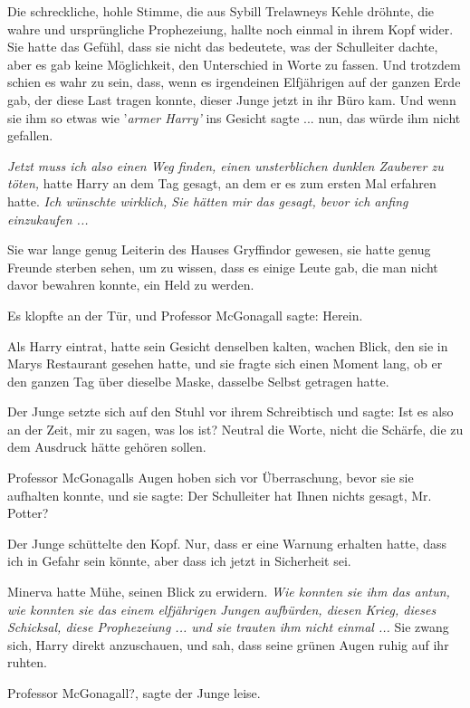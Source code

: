 Die schreckliche, hohle Stimme, die aus Sybill Trelawneys Kehle dröhnte, die
wahre und ursprüngliche Prophezeiung, hallte noch einmal in ihrem Kopf wider.
Sie hatte das Gefühl, dass sie nicht das bedeutete, was der Schulleiter dachte,
aber es gab keine Möglichkeit, den Unterschied in Worte zu fassen. Und trotzdem
schien es wahr zu sein, dass, wenn es irgendeinen Elfjährigen auf der ganzen
Erde gab, der diese Last tragen konnte, dieser Junge jetzt in ihr Büro kam. Und
wenn sie ihm so etwas wie '\emph{armer Harry'} ins Gesicht sagte ... nun, das
würde ihm nicht gefallen.

\emph{Jetzt muss ich also einen Weg finden, einen unsterblichen dunklen Zauberer
zu töten,} hatte Harry an dem Tag gesagt, an dem er es zum ersten Mal erfahren
hatte. \emph{Ich wünschte wirklich, Sie hätten mir das gesagt, bevor ich anfing
einzukaufen ...}

Sie war lange genug Leiterin des Hauses Gryffindor gewesen, sie hatte genug
Freunde sterben sehen, um zu wissen, dass es einige Leute gab, die man nicht
davor bewahren konnte, ein Held zu werden.

Es klopfte an der Tür, und Professor McGonagall sagte: \glqq{}Herein.\grqq{}

Als Harry eintrat, hatte sein Gesicht denselben kalten, wachen Blick, den sie in
Marys Restaurant gesehen hatte, und sie fragte sich einen Moment lang, ob er den
ganzen Tag über dieselbe Maske, dasselbe Selbst getragen hatte.

Der Junge setzte sich auf den Stuhl vor ihrem Schreibtisch und sagte: \glqq{}Ist
es also an der Zeit, mir zu sagen, was los ist?\grqq{} Neutral die Worte, nicht
die Schärfe, die zu dem Ausdruck hätte gehören sollen.

Professor McGonagalls Augen hoben sich vor Überraschung, bevor sie sie aufhalten
konnte, und sie sagte: \glqq{}Der Schulleiter hat Ihnen nichts gesagt, Mr.
Potter?\grqq{}

Der Junge schüttelte den Kopf. \glqq{}Nur, dass er eine Warnung erhalten hatte,
dass ich in Gefahr sein könnte, aber dass ich jetzt in Sicherheit sei.\grqq{}

Minerva hatte Mühe, seinen Blick zu erwidern. \emph{Wie konnten sie ihm das
antun, wie konnten sie das einem elfjährigen Jungen aufbürden, diesen Krieg,
dieses Schicksal, diese Prophezeiung ... und sie trauten ihm nicht einmal ...}
Sie zwang sich, Harry direkt anzuschauen, und sah, dass seine grünen Augen ruhig
auf ihr ruhten.

\glqq{}Professor McGonagall?\grqq{}, sagte der Junge leise.


